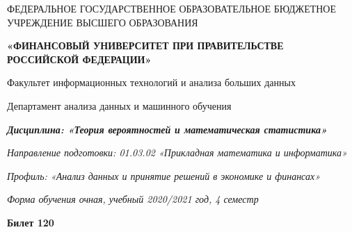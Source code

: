 \documentclass[a4paper,14pt]{article}
\begin{document}
\begin{center}
ФЕДЕРАЛЬНОЕ ГОСУДАРСТВЕННОЕ ОБРАЗОВАТЕЛЬНОЕ БЮДЖЕТНОЕ УЧРЕЖДЕНИЕ ВЫСШЕГО ОБРАЗОВАНИЯ

    \textbf{«ФИНАНСОВЫЙ УНИВЕРСИТЕТ ПРИ ПРАВИТЕЛЬСТВЕ РОССИЙСКОЙ ФЕДЕРАЦИИ»}

Факультет информационных технологий и анализа больших данных

Департамент анализа данных и машинного обучения

\textit{
	\textbf{Дисциплина: «Теория вероятностей и математическая статистика»}}

\textit{Направление подготовки: 01.03.02 «Прикладная математика и информатика»}

\textit{Профиль: «Анализ данных и принятие решений в экономике и финансах»}

\textit{Форма обучения очная, учебный 2020/2021 год, 4 семестр}

\textbf{Билет 120}

\end{center}
\end{document}
